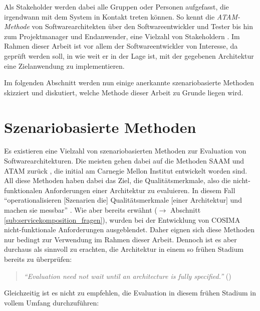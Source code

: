   Als Stakeholder werden dabei alle Gruppen oder Personen aufgefasst, die irgendwann mit dem System in Kontakt treten können. So kennt die \emph{ATAM-Methode} von Softwarearchitekten über den Softwareentwickler und Tester bis hin zum Projektmanager und Endanwender, eine Vielzahl von Stakeholdern \citep[S. 63ff]{evaluating_software_architectures}. Im Rahmen dieser Arbeit ist vor allem der Softwareentwickler von Interesse, da geprüft werden soll, in wie weit er in der Lage ist, mit der gegebenen Architektur eine Zielanwendung zu implementieren.
  
  Im folgenden Abschnitt werden nun einige anerkannte szenariobasierte Methoden skizziert und diskutiert, welche Methode dieser Arbeit zu Grunde liegen wird.

  
\section{Szenariobasierte Methoden} %
\label{sec:szenariobasierte_methoden}

  Es existieren eine Vielzahl von szenariobasierten Methoden zur Evaluation von Softwarearchitekturen. Die meisten gehen dabei auf die Methoden SAAM und ATAM zurück \citep[S. 1]{scenario_based_software_architecture_evaluation_methods}, die initial am Carnegie Mellon Institut entwickelt worden sind. All diese Methoden haben dabei das Ziel, die Qualitätsmerkmale, also die nicht-funktionalen Anforderungen einer Architektur zu evaluieren. In diesem Fall "`operationalisieren [Szenarien die] Qualitätsmerkmale [einer Architektur] und machen sie messbar"' \citep[S. 61]{effektive_software_architekturen}. Wie aber bereits erwähnt ($\to$ Abschnitt \ref{sub:servicekomposition_fragen}), wurden bei der Entwicklung von COSIMA nicht-funktionale Anforderungen ausgeblendet. Daher eignen sich diese Methoden nur bedingt zur Verwendung im Rahmen dieser Arbeit. Dennoch ist es aber durchaus als sinnvoll zu erachten, die Architektur in einem so frühen Stadium bereits zu überprüfen:
  
  \begin{quote}
    \emph{"`Evaluation need not wait until an architecture is fully specified."'} (\citep[S. 24]{evaluating_software_architectures})
  \end{quote}
  
  Gleichzeitig ist es nicht zu empfehlen, die Evaluation in diesem frühen Stadium in vollem Umfang durchzuführen:
  
